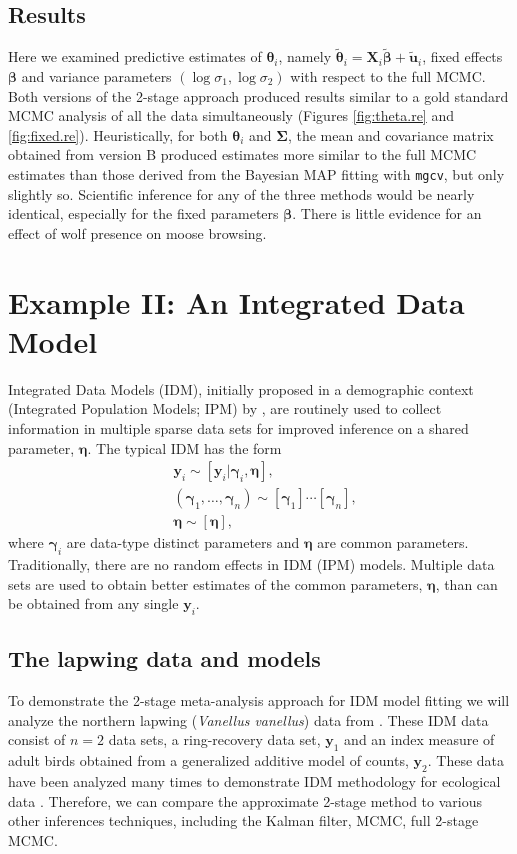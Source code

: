 \documentclass[12pt]{article}
\newcommand{\by}{\mathbf{y}}
\newcommand{\bt}{\boldsymbol{\theta}}
\newcommand{\bb}{\boldsymbol{\beta}}
\newcommand{\bn}{\boldsymbol{\eta}}
\newcommand{\bg}{\boldsymbol{\gamma}}
\newcommand{\bSig}{\boldsymbol{\Sigma}}
\newcommand{\bX}{\mathbf{X}}
\newcommand{\bu}{\mathbf{u}}
\begin{document}
\subsection{Results}
Here we examined predictive estimates of $\bt_i$, namely $\tilde{\bt}_i = \bX_i\tilde{\bb} + \tilde{\bu}_i$, fixed effects $\bb$ and variance parameters $(\log\sigma_1, \log\sigma_2)$ with respect to the full MCMC. Both versions of the 2-stage approach produced results similar to a gold standard MCMC analysis of all the data simultaneously (Figures \ref{fig:theta.re} and \ref{fig:fixed.re}). Heuristically, for both $\bt_i$ and $\bSig$,  the mean and covariance matrix obtained from version B produced estimates more similar to the full MCMC estimates than those derived from the Bayesian MAP fitting with {\tt mgcv}, but only slightly so. Scientific inference for any of the three methods would be nearly identical, especially for the fixed parameters $\bb$. There is little evidence for an effect of wolf presence on moose browsing. 



\section{Example II: An Integrated Data Model}

Integrated Data Models (IDM), initially proposed in a demographic context (Integrated Population Models; IPM) by \cite{besbeas2002integrating}, are routinely used to collect information in multiple sparse data sets for improved inference on a shared parameter, $\bn$. The typical IDM \citep{schaub2011integrated} has the form
\[
\begin{aligned}
&\by_i \sim [\by_i|\bg_i, \bn], \\
&(\bg_1,\dots,\bg_n) \sim [\bg_1]\cdots[\bg_n],\\
&\bn \sim [\bn],
\end{aligned}
\]
where $\bg_i$ are data-type distinct parameters and $\bn$ are common parameters. Traditionally, there are no random effects in IDM (IPM) models. Multiple data sets are used to obtain better estimates of the common parameters, $\bn$, than can be obtained from any single $\by_i$. 

\subsection{The lapwing data and models}

To demonstrate the 2-stage meta-analysis approach for IDM model fitting we will analyze the northern lapwing ({\it Vanellus vanellus}) data from \cite{besbeas2002integrating}. These IDM data consist of $n=2$ data sets, a ring-recovery data set, $\by_1$ and an index measure of adult birds obtained from a generalized additive model of counts, $\by_2$. These data have been analyzed many times to demonstrate IDM methodology for ecological data \citep{besbeas2002integrating, Brooks:2004zi, besbeas2019exact, goudie2019joining}. Therefore, we can compare the approximate 2-stage method to various other inferences techniques, including the Kalman filter, MCMC, full 2-stage MCMC. 
\end{document}

